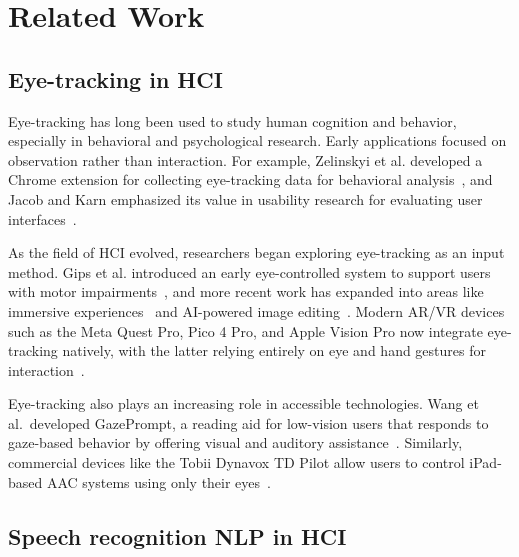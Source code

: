 
\section{Related Work}

\subsection{Eye-tracking in HCI}

Eye-tracking has long been used to study human cognition and behavior, especially in behavioral and psychological research. Early applications focused on observation rather than interaction. For example, Zelinskyi et al. developed a Chrome extension for collecting eye-tracking data for behavioral analysis~\cite{zelinskyi2024eyetracking}, and Jacob and Karn emphasized its value in usability research for evaluating user interfaces~\cite{jacob2003commentary}.

As the field of \ac{HCI} evolved, researchers began exploring eye-tracking as an input method. Gips et al. introduced an early eye-controlled system to support users with motor impairments~\cite{gips1996eagleeyes}, and more recent work has expanded into areas like immersive experiences~\cite{dondi2023gazehci} and AI-powered image editing~\cite{karlander2023ai}. Modern AR/VR devices such as the Meta Quest Pro, Pico 4 Pro, and Apple Vision Pro now integrate eye-tracking natively, with the latter relying entirely on eye and hand gestures for interaction~\cite{huang2024visionpro}.

Eye-tracking also plays an increasing role in accessible technologies. Wang et al.\ developed GazePrompt, a reading aid for low-vision users that responds to gaze-based behavior by offering visual and auditory assistance~\cite{wang2024gazeprompt}. Similarly, commercial devices like the Tobii Dynavox TD Pilot allow users to control iPad-based AAC systems using only their eyes~\cite{poster2025td}.

\subsection{Speech recognition NLP in HCI}

